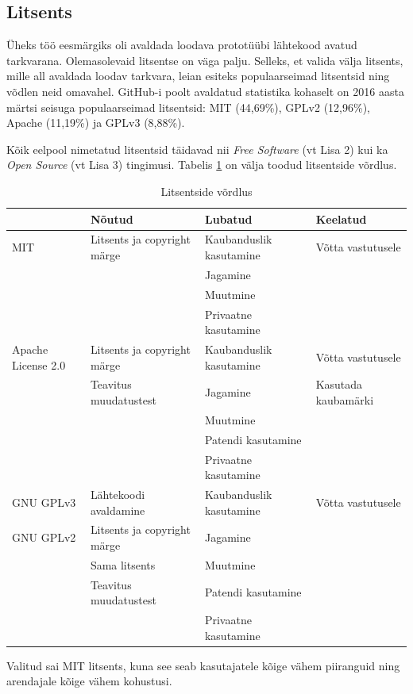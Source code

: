 \documentclass[a4paper,12pt]{article} %
\begin{document}
\subsection{Litsents}
Üheks töö eesmärgiks oli avaldada loodava prototüübi lähtekood avatud tarkvarana. Olemasolevaid litsentse on väga palju. Selleks, et valida välja litsents, mille all avaldada loodav tarkvara, leian esiteks populaarseimad litsentsid ning võdlen neid omavahel.
GitHub-i poolt avaldatud statistika kohaselt on 2016 aasta märtsi seisuga populaarseimad litsentsid: MIT (44,69\%), GPLv2 (12,96\%), Apache (11,19\%) ja GPLv3 (8,88\%). \cite{GitHub_Opensource_Licence_Usage}\par
Kõik eelpool nimetatud litsentsid täidavad nii \textit{Free Software} (vt Lisa 2) kui ka \textit{Open Source} (vt Lisa 3) tingimusi. Tabelis \ref{table_litsentside_vordlus} on välja toodud litsentside võrdlus.

\begin{table}[H]%
\begin{center}
\caption{Litsentside võrdlus}
\label{table_litsentside_vordlus}
\begin{tabular}{|p{3cm}|p{4cm}|p{4cm}|p{4cm}|}
\hline
\rowcolor{rowgray}
 & Nõutud & Lubatud & Keelatud \\ \hline
MIT & Litsents ja copyright märge & Kaubanduslik kasutamine & Võtta vastutusele \\
 &  & Jagamine &  \\
 &  & Muutmine &  \\
 &  & Privaatne kasutamine &  \\ \hline
Apache \newline License 2.0 & Litsents ja copyright märge & Kaubanduslik kasutamine & Võtta vastutusele \\
 & Teavitus muudatustest & Jagamine & Kasutada kaubamärki \\
 &  & Muutmine &  \\
 &  & Patendi kasutamine &  \\
 &  & Privaatne kasutamine &  \\ \hline
GNU GPLv3 & Lähtekoodi avaldamine & Kaubanduslik kasutamine & Võtta vastutusele \\
GNU GPLv2 & Litsents ja copyright märge & Jagamine &  \\
 & Sama litsents & Muutmine &  \\
 & Teavitus muudatustest & Patendi kasutamine &  \\
 &  & Privaatne kasutamine & \\ \hline
\end{tabular}
\cite{Licences}
\end{center}
\end{table}
Valitud sai MIT litsents, kuna see seab kasutajatele kõige vähem piiranguid ning arendajale kõige vähem kohustusi.
\end{document}
